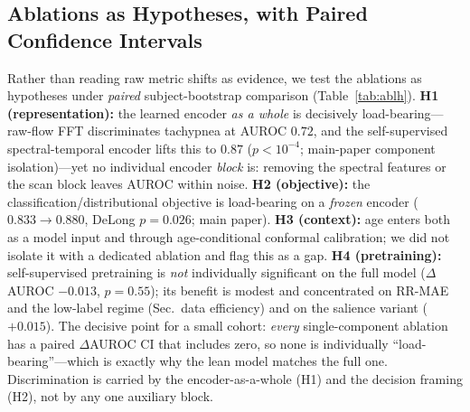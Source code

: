 \subsection{Ablations as Hypotheses, with Paired Confidence Intervals}
Rather than reading raw metric shifts as evidence, we test the ablations as hypotheses under \emph{paired}
subject-bootstrap comparison (Table~\ref{tab:ablh}). \textbf{H1 (representation):} the learned encoder
\emph{as a whole} is decisively load-bearing---raw-flow FFT discriminates tachypnea at AUROC $0.72$, and the
self-supervised spectral-temporal encoder lifts this to $0.87$ ($p<10^{-4}$; main-paper component
isolation)---yet no individual encoder \emph{block} is: removing the spectral features or the scan block
leaves AUROC within noise. \textbf{H2 (objective):} the classification/distributional objective is
load-bearing on a \emph{frozen} encoder ($0.833\to0.880$, DeLong $p=0.026$; main paper). \textbf{H3
(context):} age enters both as a model input and through age-conditional conformal calibration; we did not
isolate it with a dedicated ablation and flag this as a gap. \textbf{H4 (pretraining):} self-supervised
pretraining is \emph{not} individually significant on the full model ($\Delta$AUROC $-0.013$, $p=0.55$); its
benefit is modest and concentrated on RR-MAE and the low-label regime (Sec.~data efficiency) and on the
salience variant ($+0.015$). The decisive point for a small cohort: \emph{every} single-component ablation
has a paired $\Delta$AUROC CI that includes zero, so none is individually ``load-bearing''---which is exactly
why the lean model matches the full one. Discrimination is carried by the encoder-as-a-whole (H1) and the
decision framing (H2), not by any one auxiliary block.

